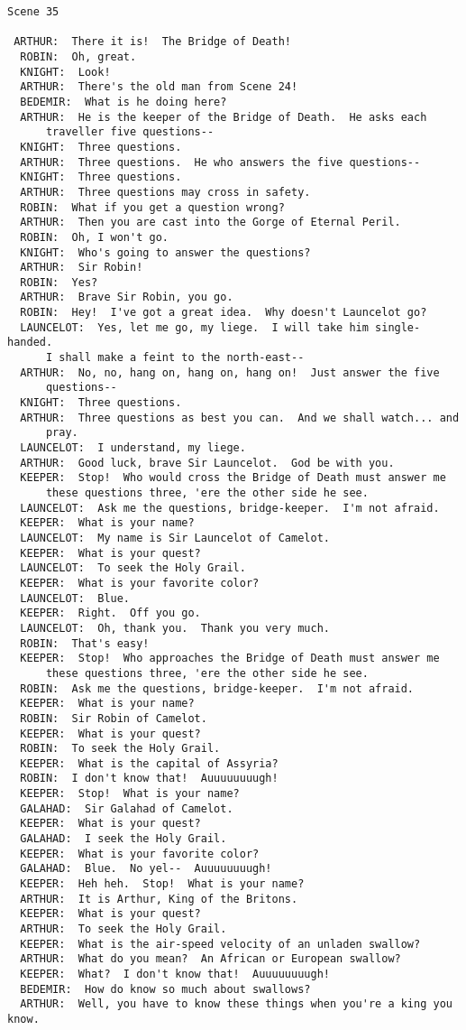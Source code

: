 \documentclass{article}
\begin{document}
\begin{verbatim}
Scene 35

 ARTHUR:  There it is!  The Bridge of Death!
  ROBIN:  Oh, great.
  KNIGHT:  Look!
  ARTHUR:  There's the old man from Scene 24!
  BEDEMIR:  What is he doing here?
  ARTHUR:  He is the keeper of the Bridge of Death.  He asks each
      traveller five questions--
  KNIGHT:  Three questions.
  ARTHUR:  Three questions.  He who answers the five questions--
  KNIGHT:  Three questions.
  ARTHUR:  Three questions may cross in safety.
  ROBIN:  What if you get a question wrong?
  ARTHUR:  Then you are cast into the Gorge of Eternal Peril.
  ROBIN:  Oh, I won't go.
  KNIGHT:  Who's going to answer the questions?
  ARTHUR:  Sir Robin!
  ROBIN:  Yes?
  ARTHUR:  Brave Sir Robin, you go.
  ROBIN:  Hey!  I've got a great idea.  Why doesn't Launcelot go?
  LAUNCELOT:  Yes, let me go, my liege.  I will take him single-handed.
      I shall make a feint to the north-east--
  ARTHUR:  No, no, hang on, hang on, hang on!  Just answer the five
      questions--
  KNIGHT:  Three questions.
  ARTHUR:  Three questions as best you can.  And we shall watch... and
      pray.
  LAUNCELOT:  I understand, my liege.
  ARTHUR:  Good luck, brave Sir Launcelot.  God be with you.
  KEEPER:  Stop!  Who would cross the Bridge of Death must answer me
      these questions three, 'ere the other side he see.
  LAUNCELOT:  Ask me the questions, bridge-keeper.  I'm not afraid.
  KEEPER:  What is your name?
  LAUNCELOT:  My name is Sir Launcelot of Camelot.
  KEEPER:  What is your quest?
  LAUNCELOT:  To seek the Holy Grail.
  KEEPER:  What is your favorite color?
  LAUNCELOT:  Blue.
  KEEPER:  Right.  Off you go.
  LAUNCELOT:  Oh, thank you.  Thank you very much.
  ROBIN:  That's easy!
  KEEPER:  Stop!  Who approaches the Bridge of Death must answer me
      these questions three, 'ere the other side he see.
  ROBIN:  Ask me the questions, bridge-keeper.  I'm not afraid.
  KEEPER:  What is your name?
  ROBIN:  Sir Robin of Camelot.
  KEEPER:  What is your quest?
  ROBIN:  To seek the Holy Grail.
  KEEPER:  What is the capital of Assyria?
  ROBIN:  I don't know that!  Auuuuuuuugh!
  KEEPER:  Stop!  What is your name?
  GALAHAD:  Sir Galahad of Camelot.
  KEEPER:  What is your quest?
  GALAHAD:  I seek the Holy Grail.
  KEEPER:  What is your favorite color?
  GALAHAD:  Blue.  No yel--  Auuuuuuuugh!
  KEEPER:  Heh heh.  Stop!  What is your name?
  ARTHUR:  It is Arthur, King of the Britons.
  KEEPER:  What is your quest?
  ARTHUR:  To seek the Holy Grail.
  KEEPER:  What is the air-speed velocity of an unladen swallow?
  ARTHUR:  What do you mean?  An African or European swallow?
  KEEPER:  What?  I don't know that!  Auuuuuuuugh!
  BEDEMIR:  How do know so much about swallows?
  ARTHUR:  Well, you have to know these things when you're a king you know.


\end{verbatim}
\end{document}
